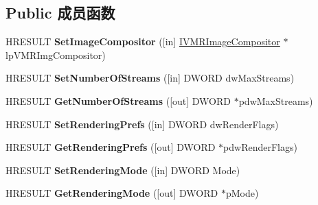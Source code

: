 \subsection*{Public 成员函数}
\begin{DoxyCompactItemize}
\item 
\mbox{\label{interface_i_v_m_r_filter_config_a9bcd6e056aaec20ee073051a4e18e64b}} 
H\+R\+E\+S\+U\+LT {\bfseries Set\+Image\+Compositor} (\mbox{[}in\mbox{]} \hyperlink{interface_i_v_m_r_image_compositor}{I\+V\+M\+R\+Image\+Compositor} $\ast$lp\+V\+M\+R\+Img\+Compositor)
\item 
\mbox{\label{interface_i_v_m_r_filter_config_a958384e0294661a93031b6e4e81c0f09}} 
H\+R\+E\+S\+U\+LT {\bfseries Set\+Number\+Of\+Streams} (\mbox{[}in\mbox{]} D\+W\+O\+RD dw\+Max\+Streams)
\item 
\mbox{\label{interface_i_v_m_r_filter_config_a68ab9ec891a80b15c7fad3eb6f14ca44}} 
H\+R\+E\+S\+U\+LT {\bfseries Get\+Number\+Of\+Streams} (\mbox{[}out\mbox{]} D\+W\+O\+RD $\ast$pdw\+Max\+Streams)
\item 
\mbox{\label{interface_i_v_m_r_filter_config_a48d735738dde636869013e7ec30e44ba}} 
H\+R\+E\+S\+U\+LT {\bfseries Set\+Rendering\+Prefs} (\mbox{[}in\mbox{]} D\+W\+O\+RD dw\+Render\+Flags)
\item 
\mbox{\label{interface_i_v_m_r_filter_config_ad5f628c00d6a18239ce95a9b04da8f71}} 
H\+R\+E\+S\+U\+LT {\bfseries Get\+Rendering\+Prefs} (\mbox{[}out\mbox{]} D\+W\+O\+RD $\ast$pdw\+Render\+Flags)
\item 
\mbox{\label{interface_i_v_m_r_filter_config_a72fb7b660aa37866b30247c924de2a4c}} 
H\+R\+E\+S\+U\+LT {\bfseries Set\+Rendering\+Mode} (\mbox{[}in\mbox{]} D\+W\+O\+RD Mode)
\item 
\mbox{\label{interface_i_v_m_r_filter_config_a55935f35bb90b71e72c73580809de7e2}} 
H\+R\+E\+S\+U\+LT {\bfseries Get\+Rendering\+Mode} (\mbox{[}out\mbox{]} D\+W\+O\+RD $\ast$p\+Mode)
\item 
\mbox{\label{interface_i_v_m_r_filter_config_ae693bf27f6af10ad80aebdb5d27b03b2}} 

\end{DoxyCompactItemize}
